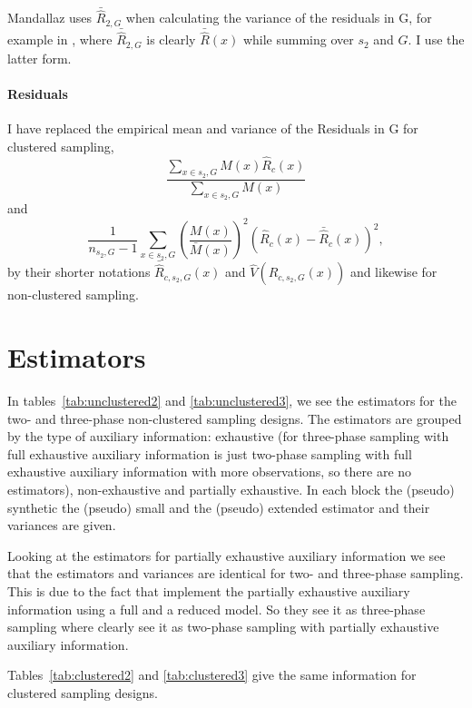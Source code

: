 \documentclass[a4paper]{article}
\begin{document}
Mandallaz uses $\bar{\hat{R}}_{2,G}$ when calculating the variance of the
residuals in G, for example in \cite[eq 26]{Man13a}, where  $\bar{\hat{R}}_{2,G}$ is clearly
$\bar{\hat{R}}(x)$ while summing over $s_2$ and $G$. I use the latter form.

\paragraph{Residuals}
I have replaced
the empirical mean and variance of the Residuals in G for clustered
sampling,
$$\frac{\sum_{x\in s_2,G}{M(x)\hat{R}_c(x)}}{\sum_{x\in s_2,G}{M(x)}}$$
and
$$\frac{1}{n_{s_2,G}-1} \sum_{x\in
s_2,G}{\left(\frac{M(x)}{\bar{M}(x)}\right)^2 (\hat{R}_c(x)
-\bar{\hat{R}}_c(x))^2},$$
by their shorter notations
$\bar{\hat{R}}_{c,s_2,G}(x)$ and 
$\hat{V}(\hat{R}_{c,s_2,G}(x))$
and likewise for non-clustered sampling.



\section{Estimators\label{sec:estimators}}

In tables~\ref{tab:unclustered2} and \ref{tab:unclustered3},
we see the estimators for the two- and three-phase non-clustered sampling
designs.
The estimators are grouped by the type of auxiliary information: exhaustive (for
 three-phase sampling with full exhaustive auxiliary
information is just two-phase sampling with full exhaustive auxiliary
information with more observations, so there are no estimators),
non-exhaustive and partially exhaustive.
In each block the (pseudo) synthetic the (pseudo) small and the
(pseudo) extended estimator and their variances are given.



Looking at the estimators for partially exhaustive auxiliary information
we see that the estimators and variances are identical for two- and three-phase sampling.
This is due to the fact that 
\cite{hill2017} implement the partially exhaustive auxiliary information using
a full and a reduced model. So they see it as three-phase
sampling where \cite{Man13b} clearly see it as two-phase sampling with partially
exhaustive auxiliary information.



Tables~\ref{tab:clustered2} and \ref{tab:clustered3} give the same information for clustered sampling
designs.



{
    \fontsize{8}{11}\selectfont
    
    
}




\end{document}
